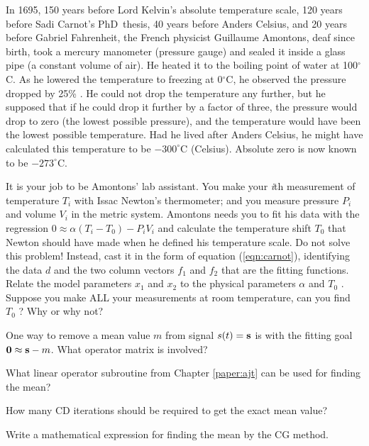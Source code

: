 \begin{exer}
\item In 1695,
150 years before Lord Kelvin's absolute temperature scale,
120 years before Sadi Carnot's PhD~thesis,
40 years before Anders Celsius,
and 20 years before Gabriel Fahrenheit,
the French physicist Guillaume Amontons,
deaf  since birth,
took a mercury manometer (pressure gauge) and sealed it inside a glass pipe (a constant volume of air).
He heated it to the boiling point of water at 100$^\circ$C.
As he lowered the temperature to freezing at 0$^\circ$C,
he observed the pressure dropped by {25\%} .
He could not drop the temperature any further, but he supposed that if he could drop it further by a factor of three,
the pressure would drop to zero (the lowest possible pressure), and the temperature would have been the lowest possible temperature.
Had he lived after Anders Celsius, he might have calculated this temperature to be $-300^\circ$C (Celsius).
Absolute  zero is now known to be $-273^\circ$C.
\par
It is your job to be Amontons' lab assistant.
You make your {\it i}th measurement of temperature $T_i$ with Issac
Newton's thermometer; 
and you measure pressure $P_i$ and volume $V_i$ in the metric system.
Amontons needs you to fit his data with the regression $0 \approx \alpha (T_i - T_0 ) - P_i V_i$ and calculate the temperature shift $T_0$ that Newton should have made when he defined his temperature scale.
Do not solve this problem!
Instead,
cast it in the form of equation (\ref{eqn:carnot}),
identifying the data $d$ and the two column vectors $f_1$ and $f_2$ that are the fitting functions.
Relate the model parameters $x_1$ and $x_2$ to the physical parameters $\alpha$ and $T_0$ .
Suppose you make ALL your measurements at room temperature,
can you find $T_0$ ?
Why or why not? 

\item
One way to remove a mean value $m$ from signal $s(t)= \bold s$
is with the fitting goal $\bold 0 \approx \bold s - m$.
What operator matrix is involved?

\item
What linear operator subroutine from Chapter \ref{paper:ajt}
can be used for finding the mean?

\item
How many CD iterations should be required to get the exact mean value?

\item
Write a mathematical expression for finding the mean by the CG method.

\end{exer}


\clearpage

